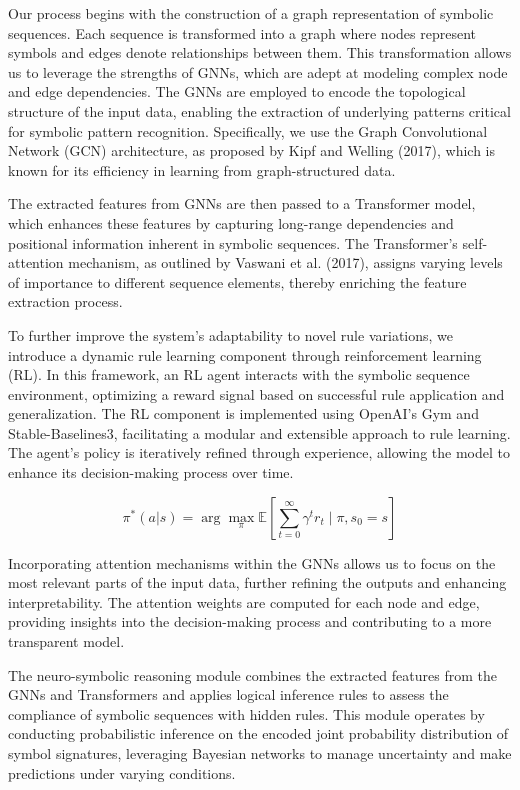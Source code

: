 \documentclass{article}
\begin{document}
Our process begins with the construction of a graph representation of symbolic sequences. Each sequence is transformed into a graph where nodes represent symbols and edges denote relationships between them. This transformation allows us to leverage the strengths of GNNs, which are adept at modeling complex node and edge dependencies. The GNNs are employed to encode the topological structure of the input data, enabling the extraction of underlying patterns critical for symbolic pattern recognition. Specifically, we use the Graph Convolutional Network (GCN) architecture, as proposed by Kipf and Welling (2017), which is known for its efficiency in learning from graph-structured data.

The extracted features from GNNs are then passed to a Transformer model, which enhances these features by capturing long-range dependencies and positional information inherent in symbolic sequences. The Transformer's self-attention mechanism, as outlined by Vaswani et al. (2017), assigns varying levels of importance to different sequence elements, thereby enriching the feature extraction process.

To further improve the system's adaptability to novel rule variations, we introduce a dynamic rule learning component through reinforcement learning (RL). In this framework, an RL agent interacts with the symbolic sequence environment, optimizing a reward signal based on successful rule application and generalization. The RL component is implemented using OpenAI's Gym and Stable-Baselines3, facilitating a modular and extensible approach to rule learning. The agent's policy is iteratively refined through experience, allowing the model to enhance its decision-making process over time.

\begin{equation}
\pi^*(a|s) = \arg\max_{\pi} \mathbb{E}\left[\sum_{t=0}^{\infty} \gamma^t r_t \mid \pi, s_0 = s\right]
\end{equation}

Incorporating attention mechanisms within the GNNs allows us to focus on the most relevant parts of the input data, further refining the outputs and enhancing interpretability. The attention weights are computed for each node and edge, providing insights into the decision-making process and contributing to a more transparent model.

The neuro-symbolic reasoning module combines the extracted features from the GNNs and Transformers and applies logical inference rules to assess the compliance of symbolic sequences with hidden rules. This module operates by conducting probabilistic inference on the encoded joint probability distribution of symbol signatures, leveraging Bayesian networks to manage uncertainty and make predictions under varying conditions.
\end{document}
